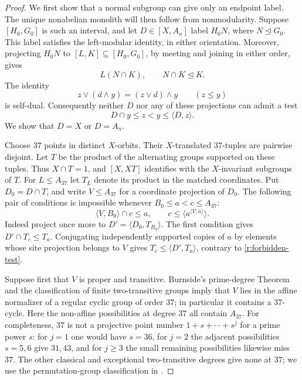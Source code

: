 \begin{proof}
We first show that a normal subgroup can give only an endpoint label.
The unique nonabelian monolith will then follow from nonmodularity.
Suppose $[H_0,G_0]$ is such an interval, and let $D\in[X,A_n]$ label
$H_0N$, where $N\trianglelefteq G_0$.  This label satisfies the
left-modular identity, in either orientation.  Moreover, projecting
$H_0N$ to $[L,K]\subseteq[H_0,G_0]$, by meeting and joining in either
order, gives
\[
 L(N\cap K),\qquad N\cap K\trianglelefteq K.
\]
The identity
\begin{equation}\label{r:left-modular}
 z\vee(d\wedge y)=(z\vee d)\wedge y\qquad(z\le y)
\end{equation}
is self-dual.  Consequently neither $D$ nor any of these projections
can admit a test
\begin{equation}\label{r:forbidden-test}
 D\cap y\le z<y\le\langle D,z\rangle.
\end{equation}
We show that $D=X$ or $D=A_n$.

Choose $37$ points in distinct $X$-orbits.  Their $X$-translated
$37$-tuples are pairwise disjoint.  Let $T$ be the product of the
alternating groups supported on these tuples.  Thus $X\cap T=1$, and
$[X,XT]$ identifies with the $X$-invariant subgroups of $T$.  For
$L\le A_{37}$ let $T_L$ denote its product in the matched coordinates.
Put $D_0=D\cap T$, and write $V\le A_{37}$ for a coordinate projection
of $D_0$.  The following pair of conditions is impossible whenever
$B_0\le a<c\le A_{37}$:
\begin{equation}\label{r:local-test}
 \langle V,B_0\rangle\cap c\le a,
 \qquad
 c\le\langle a^{\langle V,a\rangle}\rangle.
\end{equation}
Indeed project once more to
$D'=\langle D_0,T_{B_0}\rangle$.  The first condition gives
$D'\cap T_c\le T_a$.  Conjugating independently supported copies of
$a$ by elements whose site projection belongs to $V$ gives
$T_c\le\langle D',T_a\rangle$, contrary to
\eqref{r:forbidden-test}.

Suppose first that $V$ is proper and transitive.  Burnside's prime-degree
Theorem \citep{Muller2005} and the classification of finite
two-transitive groups imply
that $V$ lies in the affine normalizer of a regular cyclic group of
order $37$; in particular it contains a $37$-cycle.  Here the
non-affine possibilities at degree $37$ all contain $A_{37}$.
For completeness, $37$ is not a projective point number
$1+s+\cdots+s^j$ for a prime power $s$: for $j=1$ one would have
$s=36$, for $j=2$ the adjacent possibilities $s=5,6$ give $31,43$,
and for $j\ge3$ the small remaining possibilities likewise miss $37$.
The other classical and exceptional two-transitive degrees give none
at $37$; we use the permutation-group classification in
\citet[Table~1]{MeagherSpigaTiep2016}.


\end{proof}
